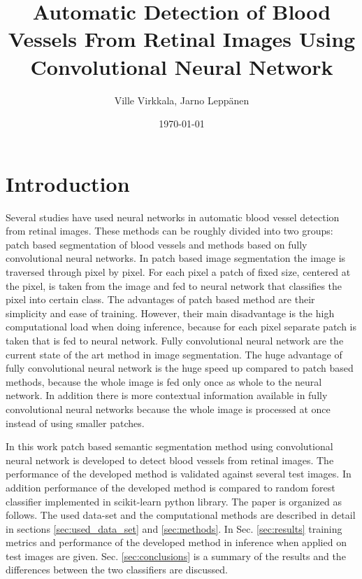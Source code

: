 \documentclass[aps,prb,10pt,twocolumn,groupedaddress]{revtex4-1}
\begin{document}
\title{Automatic Detection of Blood Vessels From Retinal Images Using Convolutional Neural Network }
\date{\today}
\author{Ville Virkkala, Jarno Leppänen}

\begin{abstract}
  
\end{abstract}

\maketitle

\section{Introduction}

Several studies have used neural networks in automatic blood vessel detection from retinal images. These methods can be roughly divided into two groups: patch based segmentation of blood vessels and methods based on fully convolutional neural networks. In patch based image segmentation the image is traversed through pixel by pixel. For each pixel a patch of fixed size, centered at the pixel, is taken from the image and fed to neural network that classifies the pixel into certain class.
The advantages of patch based method are their simplicity and ease of training. However, their main disadvantage is the high computational load when doing inference, because for each pixel separate patch is taken that is fed to neural network. Fully convolutional neural network are the current state of the art method in image segmentation. The huge advantage of fully convolutional neural network is the huge speed up compared to patch based methods, because the whole image is fed only once as whole to the neural network. In addition there is more contextual information available in fully convolutional neural networks because the whole image is processed at once instead of using smaller patches. 

In this work patch based semantic segmentation method using convolutional neural network is developed to detect blood vessels from retinal images. The performance of the developed method is validated against several test images. In addition performance of the developed method is compared to random forest classifier implemented in scikit-learn python library.
The paper is organized as follows. The used data-set and the computational
methods are described in detail in sections \ref{sec:used_data_set} and \ref{sec:methods}. In Sec. \ref{sec:results} training metrics and performance of the developed method in inference when applied on test images are given.
Sec. \ref{sec:conclusions} is a summary of the results and the differences between the two classifiers are discussed.
\end{document}
